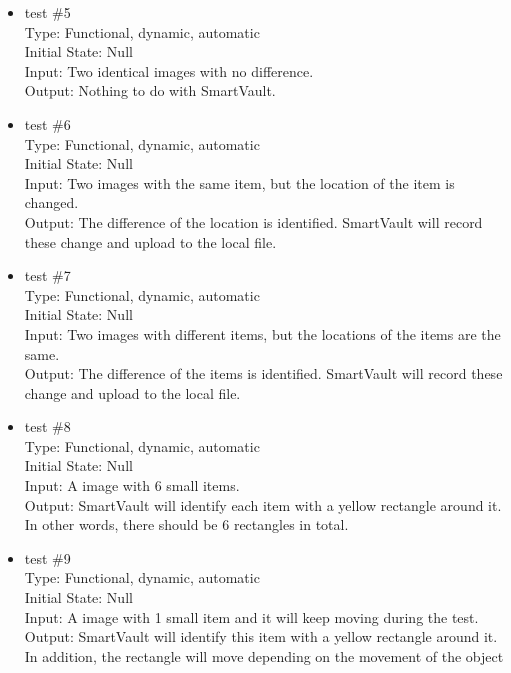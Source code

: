 \documentclass[12pt, titlepage]{article}
\begin{document}
\begin{itemize}
\item{test \#5\\}
Type: Functional, dynamic, automatic\\
Initial State: Null\\
Input: Two identical images with no difference.\\
Output: Nothing to do with SmartVault.\\ 
\item{test \#6\\}
Type: Functional, dynamic, automatic\\
Initial State: Null\\
Input: Two images with the same item, but the location of the item is changed.\\
Output: The difference of the location is identified. SmartVault will record these change and upload to the local file.\\ 
\item{test \#7\\}
Type: Functional, dynamic, automatic\\
Initial State: Null\\
Input: Two images with different items, but the locations of the items are the same.\\
Output: The difference of the items is identified. SmartVault will record these change and upload to the local file.\\ 
\item{test \#8\\}
Type: Functional, dynamic, automatic\\
Initial State: Null\\
Input: A image with 6 small items.\\
Output: SmartVault will identify each item with a yellow rectangle around it. In other words, there should be 6 rectangles in total.\\ 
\item{test \#9\\}
Type: Functional, dynamic, automatic\\
Initial State: Null\\
Input: A image with 1 small item and it will keep moving during the test.\\
Output: SmartVault will identify this item with a yellow rectangle around it. In addition, the rectangle will move depending on the movement of the object\\ 
\end{itemize}
\end{document}
